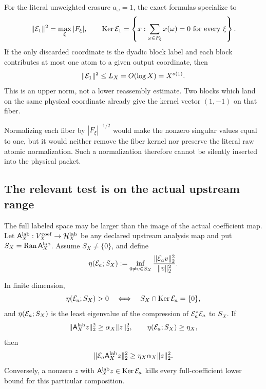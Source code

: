 For the literal unweighted erasure \(a_\omega=1\), the exact formulas
specialize to
\begin{equation}
 \|\mathcal E_1\|^2=\max_\xi|F_\xi|,
 \qquad
 \operatorname{Ker}\mathcal E_1
 =\left\{x:\sum_{\omega\in F_\xi}x(\omega)=0
                   \text{ for every }\xi\right\}.
 \label{eq:tpc63-unweighted-erasure-formulas}
\end{equation}
If the only discarded coordinate is the dyadic block label and each block
contributes at most one atom to a given output coordinate, then
\begin{equation}
 \|\mathcal E_1\|^2\le L_X=O(\log X)=X^{o(1)}.
 \label{eq:tpc63-pure-block-erasure-upper}
\end{equation}
This is an upper norm, not a lower reassembly estimate.  Two blocks which
land on the same physical coordinate already give the kernel vector
\((1,-1)\) on that fiber.

Normalizing each fiber by \(|F_\xi|^{-1/2}\) would make the nonzero
singular values equal to one, but it would neither remove the fiber kernel
nor preserve the literal raw atomic normalization.  Such a normalization
therefore cannot be silently inserted into the physical packet.

\subsection{The relevant test is on the actual upstream range}

The full labeled space may be larger than the image of the actual
coefficient map.  Let
\(\mathsf A_X^{\rm lab}:V_X^{\rm coef}\to\mathcal H_X^{\rm lab}\) be any declared
upstream analysis map and put \(S_X=\operatorname{Ran}\mathsf A_X^{\rm lab}\).  Assume
\(S_X\ne\{0\}\), and define
\begin{equation}
 \eta(\mathcal E_a;S_X)
 :=\inf_{0\ne v\in S_X}
       \frac{\|\mathcal E_av\|_2^2}{\|v\|_2^2}.
 \label{eq:tpc63-range-erasure-constant}
\end{equation}

\begin{proposition}
\label{prop:tpc63-range-erasure-criterion}
In finite dimension,
\begin{equation}
 \eta(\mathcal E_a;S_X)>0
 \quad\Longleftrightarrow\quad
 S_X\cap\operatorname{Ker}\mathcal E_a=\{0\},
 \label{eq:tpc63-range-kernel-iff}
\end{equation}
and \(\eta(\mathcal E_a;S_X)\) is the least eigenvalue of the compression of
\(\mathcal E_a^*\mathcal E_a\) to \(S_X\).  If
\begin{equation}
 \|\mathsf A_X^{\rm lab}z\|_2^2\ge\alpha_X\|z\|_2^2,
 \qquad
 \eta(\mathcal E_a;S_X)\ge\eta_X,
 \label{eq:tpc63-two-composable-lowers}
\end{equation}
then
\begin{equation}
 \|\mathcal E_a\mathsf A_X^{\rm lab}z\|_2^2
 \ge\eta_X\alpha_X\|z\|_2^2.
 \label{eq:tpc63-composed-erasure-lower}
\end{equation}
Conversely, a nonzero \(z\) with
\(\mathsf A_X^{\rm lab}z\in\operatorname{Ker}\mathcal E_a\) kills every full-coefficient lower bound for this
particular composition.
\end{proposition}

